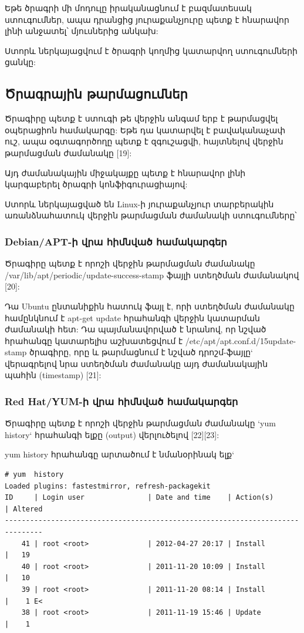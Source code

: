 \documentclass[a4paper,12pt]{article}
\begin{document}
\begin{sloppypar}
Եթե ծրագրի մի մոդուլը իրականացնում է բազմատեսակ ստուգումներ,
ապա դրանցից յուրաքանչյուրը պետք է հնարավոր լինի անջատել՝
մյուսներից անկախ:

Ստորև ներկայացվում է ծրագրի կողմից կատարվող ստուգումների ցանկը:


\subsection{Ծրագրային թարմացումներ}

Ծրագիրը պետք է ստուգի թե վերջին անգամ երբ է թարմացվել
օպերացիոն համակարգը:
Եթե դա կատարվել է բավականաչափ ուշ, ապա օգտագործողը պետք է
զգուշացվի, հայտնելով վերջին թարմացման ժամանակը [19]:

Այդ ժամանակային միջակայքը պետք է հնարավոր լինի կարգաբերել ծրագրի կոնֆիգուրացիայով:

Ստորև ներկայացված են Linux-ի յուրաքանչյուր տարբերակին առանձնահատուկ
վերջին թարմացման ժամանակի ստուգումները՝

\subsubsection{Debian/APT-ի վրա հիմնված համակարգեր}

Ծրագիրը պետք է որոշի վերջին թարմացման ժամանակը
/var/lib/apt/periodic/update-success-stamp
ֆայլի ստեղծման ժամանակով [20]:

Դա Ubuntu ընտանիքին հատուկ ֆայլ է, որի ստեղծման ժամանակը համընկնում է
apt-get update հրահանգի վերջին կատարման ժամանակի հետ: Դա պայմանավորված է
նրանով, որ նշված հրահանգը կատարելիս աշխատեցվում է
/etc/apt/apt.conf.d/15update-stamp
ծրագիրը, որը և թարմացնում է նշված դրոշմ-ֆայլը` վերագրելով նրա
ստեղծման ժամանակը այդ ժամանակային պահին (timestamp) [21]:

\subsubsection{Red Hat/YUM-ի վրա հիմնված համակարգեր}

Ծրագիրը պետք է որոշի վերջին թարմացման ժամանակը `yum history`
հրահանգի ելքը (output) վերլուծելով [22][23]:

yum history հրահանգը արտածում է նմանօրինակ ելք`

\begin{lstlisting}[language={}]
# yum  history
Loaded plugins: fastestmirror, refresh-packagekit
ID     | Login user               | Date and time    | Action(s)      | Altered
-------------------------------------------------------------------------------
    41 | root <root>              | 2012-04-27 20:17 | Install        |   19   
    40 | root <root>              | 2011-11-20 10:09 | Install        |   10   
    39 | root <root>              | 2011-11-20 08:14 | Install        |    1 E<
    38 | root <root>              | 2011-11-19 15:46 | Update         |    1 
\end{lstlisting}



\end{sloppypar}
\end{document}
